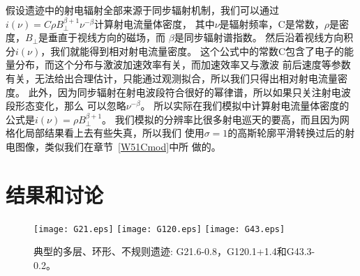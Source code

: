 假设遗迹中的射电辐射全部来源于同步辐射机制，我们可以通过
$i(\nu)=C\rho B_{\perp}^{\beta + 1}\nu^{-\beta}$计算射电流量体密度\citep{Orlando2007}，
其中$\nu$是辐射频率，C是常数，$\rho$是密度，$B_{\perp}$是垂直于视线方向的磁场，而
$\beta$是同步辐射谱指数。
然后沿着视线方向积分$i(\nu)$，我们就能得到相对射电流量密度。
这个公式中的常数C包含了电子的能量分布，而这个分布与激波加速效率有关，而加速效率又与激波
前后速度等参数有关，无法给出合理估计，只能通过观测拟合，所以我们只得出相对射电流量密度。
此外，因为同步辐射在射电波段符合很好的幂律谱，所以如果只关注射电波段形态变化，那么
可以忽略$\nu^{-\beta}$。
所以实际在我们模拟中计算射电流量体密度的公式是$i(\nu)=\rho B_{\perp}^{\beta + 1}$。
我们模拟的分辨率比很多射电巡天的要高，而且因为网格化局部结果看上去有些失真，所以我们
使用$\sigma = 1$的高斯轮廓平滑转换过后的射电图像，类似我们在章节~\ref{W51Cmod}中所
做的。


\section{结果和讨论}
\label{SWres}

\begin{figure*}
    \centering
    \texttt{[image: G21.eps]}
    \texttt{[image: G120.eps]}
    \texttt{[image: G43.eps]}
    \caption{典型的多层、环形、不规则遗迹: G21.6-0.8，G120.1+1.4和G43.3-0.2。 }
\label{fig:stat}
\end{figure*}


